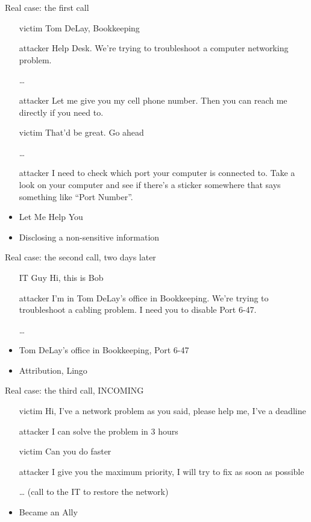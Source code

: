 \documentclass{beamer}
\begin{document}
\begin{frame}{Real case: the first call}
  \begin{itemize}
    \item[victim] Tom DeLay, Bookkeeping
    \item[attacker] Help Desk.
      We're trying to troubleshoot a computer networking problem.
    \item[\dots]
    \item[attacker] Let me give you my cell phone number.
      Then you can reach me directly if you need to.
    \item[victim] That'd be great. Go ahead
    \item[\dots]
    \item[attacker] I need to check which port your computer is
      connected to. Take a look on your computer and see if there's a
      sticker somewhere that says something like ``Port Number''.
    \item Let Me Help You
    \item Disclosing a non-sensitive information
  \end{itemize}
\end{frame}

\begin{frame}{Real case: the second call, two days later}
  \begin{itemize}
    \item[IT Guy] Hi, this is Bob
    \item[attacker] I'm in Tom DeLay's office in
      Bookkeeping. We're trying to troubleshoot a cabling problem. I
      need you to disable Port 6-47.
    \item[\dots]
    \item Tom DeLay's office in Bookkeeping, Port 6-47
    \item Attribution, Lingo
  \end{itemize}
\end{frame}

\begin{frame}{Real case: the third call, INCOMING}
  \begin{itemize}
    \item[victim] Hi, I've a network problem as you said, please
      help me, I've a deadline
    \item[attacker] I can solve the problem in 3 hours
    \item[victim] Can you do faster
    \item[attacker] I give you the maximum priority, I will try to fix
      as soon as possible
    \item[\dots] (call to the IT to restore the network)
    \item Became an Ally
  \end{itemize}
\end{frame}
\end{document}
